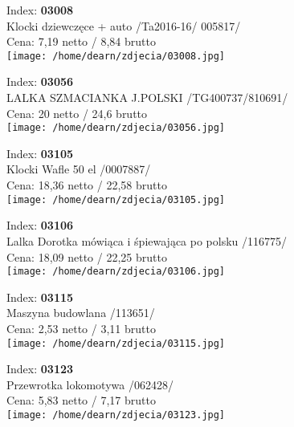 {Index: \textbf{03008}\\
Klocki dziewczęce + auto /Ta2016-16/ 005817/\\
Cena: 7,19 netto / 8,84 brutto\\
  \texttt{[image: /home/dearn/zdjecia/03008.jpg]}}\newline\newline

{Index: \textbf{03056}\\
LALKA SZMACIANKA  J.POLSKI  /TG400737/810691/\\
Cena: 20 netto / 24,6 brutto\\
  \texttt{[image: /home/dearn/zdjecia/03056.jpg]}}\newline\newline

{Index: \textbf{03105}\\
Klocki Wafle 50 el /0007887/\\
Cena: 18,36 netto / 22,58 brutto\\
  \texttt{[image: /home/dearn/zdjecia/03105.jpg]}}\newline\newline

{Index: \textbf{03106}\\
Lalka Dorotka mówiąca i śpiewająca po polsku /116775/\\
Cena: 18,09 netto / 22,25 brutto\\
  \texttt{[image: /home/dearn/zdjecia/03106.jpg]}}\newline\newline

{Index: \textbf{03115}\\
Maszyna budowlana /113651/\\
Cena: 2,53 netto / 3,11 brutto\\
  \texttt{[image: /home/dearn/zdjecia/03115.jpg]}}\newline\newline

{Index: \textbf{03123}\\
Przewrotka lokomotywa /062428/\\
Cena: 5,83 netto / 7,17 brutto\\
  \texttt{[image: /home/dearn/zdjecia/03123.jpg]}}\newline\newline


